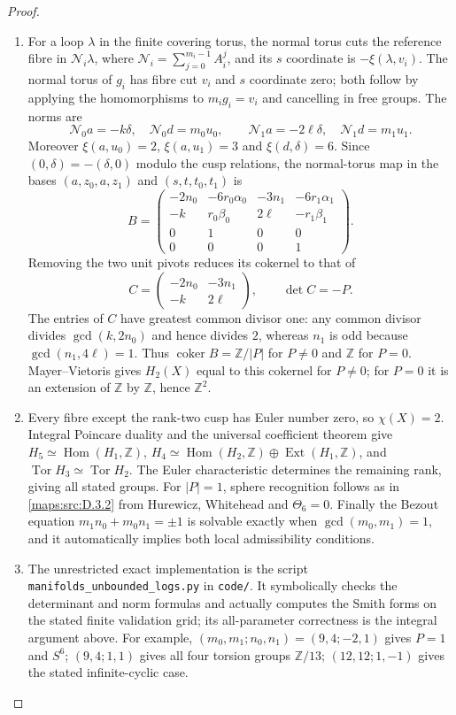 \begin{proof}
\begin{enumerate}[label=\arabic*.,leftmargin=*]
\item For a loop $\lambda$ in the finite covering torus, the normal
torus cuts the reference fibre in
$\mathcal N_i\lambda$, where
$\mathcal N_i=\sum_{j=0}^{m_i-1}A_i^j$, and its $s$ coordinate
is $-\xi(\lambda,v_i)$. The normal torus of $g_i$ has
fibre cut $v_i$ and $s$ coordinate zero; both follow by applying
the homomorphisms to $m_i g_i=v_i$ and cancelling in free groups.
The norms are
\[
 \mathcal N_0a=-k\delta,\quad \mathcal N_0d=m_0u_0,
 \qquad
 \mathcal N_1a=-2\ell\delta,\quad \mathcal N_1d=m_1u_1.
\]
Moreover $\xi(a,u_0)=2$, $\xi(a,u_1)=3$ and
$\xi(d,\delta)=6$. Since $(0,\delta)=-(\delta,0)$ modulo
the cusp relations, the normal-torus map in the bases
$(a,z_0,a,z_1)$ and $(s,t,t_0,t_1)$ is
\[
 B=\begin{pmatrix}
 -2n_0&-6r_0\alpha_0&-3n_1&-6r_1\alpha_1\\
 -k&r_0\beta_0&2\ell&-r_1\beta_1\\
 0&1&0&0\\
 0&0&0&1
 \end{pmatrix}.
\]
Removing the two unit pivots reduces its cokernel to that of
\[
 C=\begin{pmatrix}-2n_0&-3n_1\\-k&2\ell\end{pmatrix},
 \qquad \det C=-P.
\]
The entries of $C$ have greatest common divisor one: any common
divisor divides $\gcd(k,2n_0)$ and hence divides $2$, whereas
$n_1$ is odd because $\gcd(n_1,4\ell)=1$.
Thus $\operatorname{coker}B=\mathbb Z/|P|$ for $P\ne0$
and $\mathbb Z$ for $P=0$. Mayer--Vietoris gives $H_2(X)$
equal to this cokernel for $P\ne0$; for $P=0$ it is an extension
of $\mathbb Z$ by $\mathbb Z$, hence $\mathbb Z^2$.

\item Every fibre except the rank-two cusp has Euler number zero, so
$\chi(X)=2$. Integral Poincare duality and the universal
coefficient theorem give $H_5\simeq\operatorname{Hom}(H_1,\mathbb Z)$,
$H_4\simeq\operatorname{Hom}(H_2,\mathbb Z)
\oplus\operatorname{Ext}(H_1,\mathbb Z)$, and
$\operatorname{Tor}H_3\simeq\operatorname{Tor}H_2$.
The Euler characteristic determines the remaining rank, giving
all stated groups. For $|P|=1$, sphere recognition follows as in
\ref{maps:src:D.3.2} from Hurewicz, Whitehead and $\Theta_6=0$.
Finally the Bezout equation $m_1n_0+m_0n_1=\pm1$ is solvable
exactly when $\gcd(m_0,m_1)=1$, and it automatically implies both
local admissibility conditions.

\item The unrestricted exact implementation is the script
\texttt{manifolds\_unbounded\_logs.py} in \texttt{code/}. It symbolically checks
the determinant and norm formulas and actually computes the Smith
forms on the stated finite validation grid; its all-parameter
correctness is the integral argument above. For example,
$(m_0,m_1;n_0,n_1)=(9,4;-2,1)$ gives $P=1$ and $S^6$;
$(9,4;1,1)$ gives all four torsion groups $\mathbb Z/13$;
$(12,12;1,-1)$ gives the stated infinite-cyclic case.
\end{enumerate}
\end{proof}

